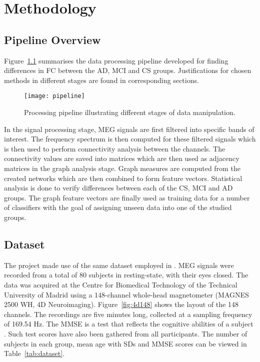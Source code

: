 
\chapter{Methodology}

	\section{Pipeline Overview}
	
	Figure~\ref{fig:pipeline} summarises the data processing pipeline developed for finding differences in \ac{FC} between the \ac{AD}, \ac{MCI} and \ac{CS} groups. Justifications for chosen methods in different stages are found in corresponding sections.
	
	\begin{figure}
	    \centering
	    \texttt{[image: pipeline]}
	    \caption{Processing pipeline illustrating different stages of data manipulation.}
	    \label{fig:pipeline}
	\end{figure}

	In the signal processing stage, \ac{MEG} signals are first filtered into specific bands of interest. The frequency spectrum is then computed for these filtered signals which is then used to perform connectivity analysis between the channels. The connectivity values are saved into matrices which are then used as adjacency matrices in the graph analysis stage. Graph measures are computed from the created networks which are then combined to form feature vectors. Statistical analysis is done to verify differences between each of the \ac{CS}, \ac{MCI} and \ac{AD} groups. The graph feature vectors are finally used as training data for a number of classifiers with the goal of assigning unseen data into one of the studied groups.


	\section{Dataset}
	The project made use of the same dataset employed in \textcite{Escudero2011a}. \ac{MEG} signals were recorded from a total of 80 subjects in resting-state, with their eyes closed. The data was acquired at the Centre for Biomedical Technology of the Technical University of Madrid using a 148-channel whole-head magnetometer (MAGNES 2500 WH, 4D Neuroimaging). Figure~\ref{fig:4d148} shows the layout of the 148 channels. The recordings are five minutes long, collected at a sampling frequency of 169.54 Hz. The \ac{MMSE} is a test that reflects the cognitive abilities of a subject \autocite{Folstein1975}. Such test scores have also been gathered from all participants. The number of subjects in each group, mean age with \acp{SD} and \ac{MMSE} scores can be viewed in Table~\ref{tab:dataset}.
	
